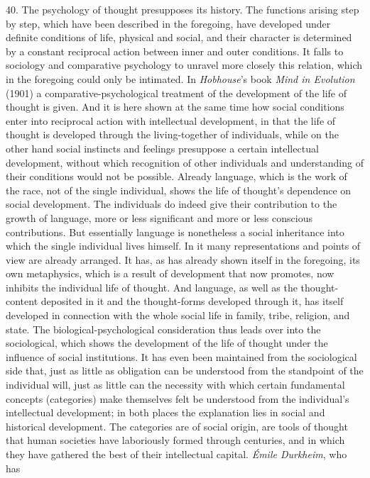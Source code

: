 \documentclass[12pt,a4paper]{book}
\newcommand{\opage}[1]{\marginnote{\footnotesize\textit{[#1]}}}
\begin{document}
\opage{109}40. The psychology of thought presupposes its history. The functions
arising step by step, which have been described in the foregoing, have
developed under definite conditions of life, physical and social, and
their character is determined by a constant reciprocal action between inner
and outer conditions. It falls to sociology and comparative psychology to
unravel more closely this relation, which in the foregoing could only be
intimated. In \emph{Hobhouse}'s book \emph{Mind in Evolution} (1901) a
comparative-psychological treatment of the development of the life of
thought is given. And it is here shown at the same time how social
conditions enter into reciprocal action with intellectual development, in
that the life of thought is developed through the living-together of
individuals, while on the other hand social instincts and feelings
presuppose a certain intellectual development, without which recognition of
other individuals and understanding of their conditions would not be
possible. Already language, which is the work of the race, not of the
single individual, shows the life of thought's dependence on social
development. The individuals do indeed give their contribution to the
growth of language, more or less significant and more or less conscious
contributions. But essentially language is nonetheless a social
inheritance into which the single individual lives himself. In it many
representations and points of view are already arranged. It has, as has
already shown itself in the foregoing, its own metaphysics, which is a
result of development that now promotes, now \opage{110}inhibits the individual life
of thought. And language, as well as the thought-content deposited in it
and the thought-forms developed through it, has itself developed in
connection with the whole social life in family, tribe, religion, and
state. The biological-psychological consideration thus leads over into the
sociological, which shows the development of the life of thought under the
influence of social institutions. It has even been maintained from the
sociological side that, just as little as obligation can be understood from
the standpoint of the individual will, just as little can the necessity
with which certain fundamental concepts (categories) make themselves felt
be understood from the individual's intellectual development; in both
places the explanation lies in social and historical development. The
categories are of social origin, are tools of thought that human societies
have laboriously formed through centuries, and in which they have gathered
the best of their intellectual capital. \emph{Émile Durkheim}, who has
\end{document}
